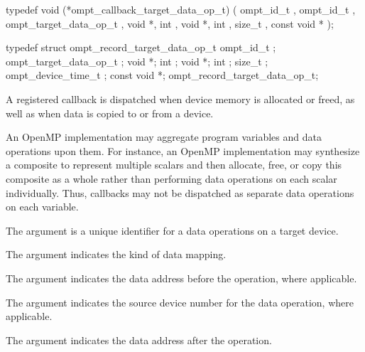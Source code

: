 \format
\begin{ccppspecific}
\begin{omptCallback}
typedef void (*ompt_callback_target_data_op_t) (
  ompt_id_t ,
  ompt_id_t ,
  ompt_target_data_op_t ,
  void *,
  int ,
  void *,
  int ,
  size_t ,
  const void *
);
\end{omptCallback}
\end{ccppspecific}

\record
\begin{ccppspecific}
\begin{omptRecord}
typedef struct ompt_record_target_data_op_t {
  ompt_id_t ;
  ompt_target_data_op_t ;
  void *;
  int ;
  void *;
  int ;
  size_t ;
  ompt_device_time_t ;
  const void *;
} ompt_record_target_data_op_t;
\end{omptRecord}
\end{ccppspecific}

\descr
A registered  callback is dispatched when device 
memory is allocated or freed, as well as when data is copied to or from a device.

\begin{note}
An OpenMP implementation may aggregate program variables and data operations 
upon them.  For instance, an OpenMP implementation may synthesize a composite 
to represent multiple scalars and then allocate, free, or copy this composite 
as a whole rather than performing data operations on each scalar individually.  
Thus, callbacks may not be dispatched as separate data operations on each variable.
\end{note}

\argdesc
The  argument is a unique identifier for a data 
operations on a target device.

The  argument indicates the kind of data mapping.

The  argument indicates the data address before the operation, 
where applicable.

The  argument indicates the source device number
for the data operation, where applicable.

The  argument indicates the data address after the operation.

